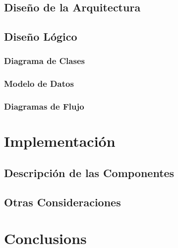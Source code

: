 \documentclass[12pt]{article}
\begin{document}
\subsection{Dise\~no de la Arquitectura}
\subsection{Dise\~no Lógico}
\subsubsection{Diagrama de Clases}
\subsubsection{Modelo de Datos}
\subsubsection{Diagramas de Flujo}

\newpage
\section{Implementación}
\subsection{Descripción de las Componentes}
\subsection{Otras Consideraciones}

\section{Conclusions}\label{conclusions}


\newpage

%
\end{document}
